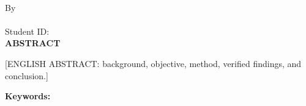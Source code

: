 \clearpage
{}
{}
\begin{center}
\textbf{\large\judulen}\\[0.5cm]
By\\
\penulis\\
Student ID: \nim\\[2em]
\textbf{ABSTRACT}\\[0.5cm]
\end{center}
[ENGLISH ABSTRACT: background, objective, method, verified findings, and conclusion.]

\vspace{0.6cm}
\noindent\textbf{Keywords:} \keywords
